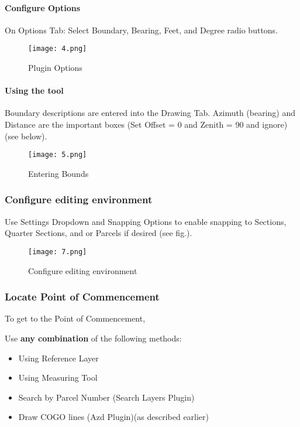 \documentclass[class=book , crop=false]{standalone}
\begin{document}
\paragraph{Configure Options}
\large On Options Tab: Select Boundary, Bearing, Feet, and Degree radio buttons.
\begin{figure}[H]
\begin{center}
\texttt{[image: 4.png]}
\end{center}
\caption{Plugin Options}
\end{figure}
\clearpage

\paragraph{Using the tool}
\large Boundary descriptions are entered into the Drawing Tab. Azimuth (bearing) and Distance are the important boxes (Set Offset = 0 and Zenith = 90 and ignore)(see below).
\begin{figure}[H]
\begin{center}
\texttt{[image: 5.png]}
\end{center}
\caption{Entering Bounds}
\end{figure}

\clearpage

\subsubsection{Configure editing environment}
\Large Use Settings Dropdown and Snapping Options to enable snapping to Sections, Quarter Sections, and or Parcels if desired (see fig.).

\begin{figure}[H]
\begin{center}
\texttt{[image: 7.png]}
\end{center}
\caption{Configure editing environment}
\end{figure}

\clearpage

\subsubsection[Locate Point of Commencement]{\Large Locate Point of Commencement}
To get to the Point of Commencement,
\medskip

Use \textbf{any combination} of the following methods:
\begin{itemize}
\item{Using Reference Layer}
\item{Using Measuring Tool}
\item{Search by Parcel Number \small(Search Layers Plugin)}
\item{Draw COGO lines \small(Azd Plugin)}\small(as described earlier)
\end{itemize}
\end{document}
